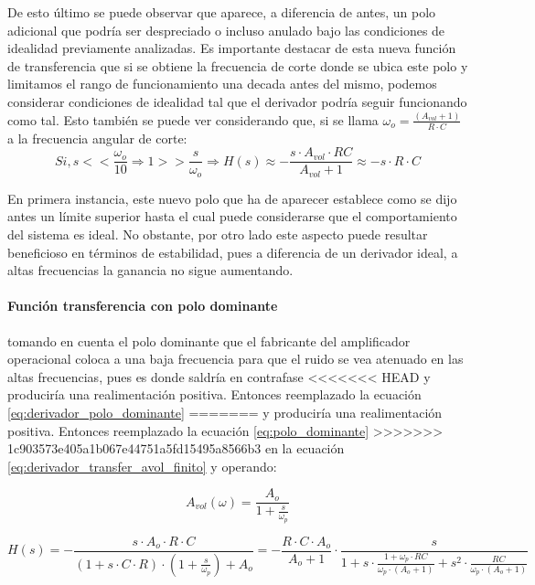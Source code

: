 De esto \'ultimo se puede observar que aparece, a diferencia de antes, un polo adicional que podr\'ia ser despreciado o incluso anulado bajo las condiciones de idealidad previamente analizadas. Es importante destacar de esta nueva funci\'on de transferencia que si se obtiene la frecuencia de corte donde se ubica este polo y limitamos el rango de funcionamiento una decada antes del mismo, podemos considerar condiciones de idealidad tal que el derivador podr\'ia seguir funcionando como tal. Esto tambi\'en se puede ver considerando que, si se llama $\omega_o = \frac{(A_{vol} + 1)}{R \cdot C}$ a la frecuencia angular de corte:
\begin{equation*}
	Si, s << \frac{\omega_o}{10} \Rightarrow 1 >> \frac{s}{\omega_o} \Rightarrow 
	H(s) \approx - \frac{s \cdot A_{vol} \cdot RC}{A_{vol} + 1} \approx
	- s \cdot R \cdot C
\end{equation*}

En primera instancia, este nuevo polo que ha de aparecer establece como se dijo antes un l\'imite superior hasta el
cual puede considerarse que el comportamiento del sistema es ideal. No obstante, por otro lado este aspecto puede resultar beneficioso
en t\'erminos de estabilidad, pues a diferencia de un derivador ideal, a altas frecuencias la ganancia no sigue aumentando.


\paragraph*{Funci\'on transferencia con polo dominante} tomando en cuenta el polo dominante 
que el fabricante del amplificador operacional coloca a una baja frecuencia para 
que el ruido se vea atenuado en las altas frecuencias, pues es donde saldr\'ia en contrafase
<<<<<<< HEAD
y producir\'ia una realimentaci\'on positiva. Entonces reemplazado la ecuaci\'on \ref{eq:derivador_polo_dominante} 
=======
y producir\'ia una realimentaci\'on positiva. Entonces reemplazado la ecuaci\'on \ref{eq:polo_dominante} 
>>>>>>> 1c903573e405a1b067e44751a5fd15495a8566b3
en la ecuaci\'on \ref{eq:derivador_transfer_avol_finito} y operando:

\begin{equation}
	A_{vol}(\omega) = \frac{A_o}{1 + \frac{s}{\omega_p}}
	\label{eq:derivador_polo_dominante}
\end{equation}

\begin{equation}
	H(s) = - \frac{s \cdot A_{o} \cdot R \cdot C}{(1 + s \cdot C \cdot R) \cdot (1 + \frac{s}{\omega_p}) + A_{o}} = - \frac{R \cdot C \cdot A_{o}}{A_{o} + 1} \cdot \frac{s}{1 + s \cdot \frac{1 + \omega_p \cdot RC}{\omega_p \cdot(A_o + 1)} + s^{2} \cdot \frac{RC}{\omega_p \cdot (A_o + 1)}}
\end{equation}


